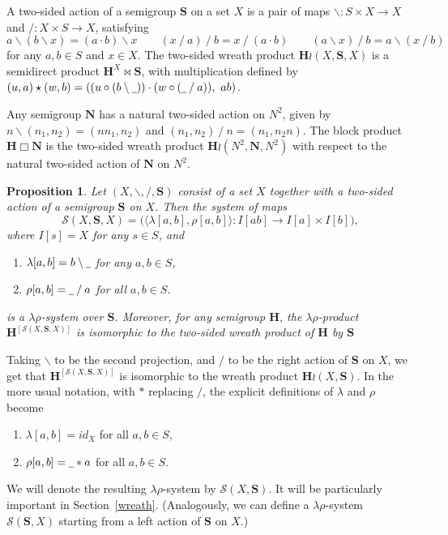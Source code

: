 \documentclass{amsart}
\newtheorem{proposition}{Proposition}
\def\ld{\mathbin{\backslash}}
\def\rd{\mathbin{/}}
\newcommand{\bl}{\underline{\hspace{1ex}}}
\begin{document}
A two-sided action of a 
semigroup $\mathbf{S}$ on a set $X$ is a pair of maps $\ld\colon S\times X\to X$ and
$\rd\colon X\times S\to X$, satisfying 
$$
a\ld (b\ld x) = (a\cdot b)\ld x\qquad (x\rd a)\rd b = x\rd (a\cdot b)\qquad
(a\ld x)\rd b=a\ld (x\rd b)
$$
for any $a,b\in S$  and $x\in X$. The two-sided wreath product
$\mathbf{H}\wr (X,\mathbf{S},X)$ is a semidirect product
$\mathbf{H}^X\bowtie \mathbf{S}$, with multiplication defined by
$(u, a)\star(w,b) = ((u\circ(b\ld\bl)) \cdot (w\circ(\bl\rd a)),\ ab)$.



Any semigroup $\mathbf{N}$ has a natural
two-sided action on $N^2$, given by $n\ld(n_1,n_2) = (nn_1, n_2)$ and
$(n_1,n_2)\rd n = (n_1,n_2n)$. The block product
$\mathbf{H}\mathbin{\Box}\mathbf{N}$ is the two-sided wreath product
$\mathbf{H}\wr (N^2,\mathbf{N},N^2)$ with
respect to the natural two-sided action of $\mathbf{N}$ on $N^2$.

\begin{proposition}\label{action-wreath-block}
Let $(X,\ld,\rd,\mathbf{S})$ consist of a set
$X$ together with a two-sided 
action of a semigroup $\mathbf{S}$ on $X$. Then the system of maps
$$
\mathcal{S}(X,\mathbf{S},X) =  \bigl(\langle \lambda[a,b],\rho[a,b]\rangle\colon
I[ab]\to I[a]\times I[b]\bigr),
$$
where $I[s]=X$ for any $s\in S$, and 
\begin{enumerate}
\item $\lambda[a,b] = b\ld\bl$\; for any $a,b\in S$,
\item $\rho[a,b] = \bl\rd a$\; for all $a,b\in S$. 
\end{enumerate}
is a $\lambda\rho$-system over $\mathbf{S}$. Moreover, for any semigroup
$\mathbf{H}$, the $\lambda\rho$-product
$\mathbf{H}^{[\mathcal{S}(X,\mathbf{S},X)]}$ is isomorphic 
to the two-sided wreath product of\/ $\mathbf{H}$ by
$\mathbf{S}$
\end{proposition}

Taking $\ld$ to be the second projection,
and $\rd$ to be the right action of $\mathbf{S}$ on $X$,
we get that $\mathbf{H}^{[\mathcal{S}(X,\mathbf{S},X)]}$ is
isomorphic to the wreath product $\mathbf{H}\wr (X,\mathbf{S})$.
In the more usual notation, with $\ast$ replacing $\rd$,
the explicit definitions of $\lambda$ and $\rho$ become   
\begin{enumerate}
\item $\lambda[a,b] = {id}_X$ for all $a,b\in S$,
\item $\rho[a,b] = \bl\ast a$ for all $a,b\in S$. 
\end{enumerate}
We will denote the
resulting $\lambda\rho$-system by $\mathcal{S}(X,\mathbf{S})$.
It will be particularly important in Section~\ref{wreath}.
(Analogously, we can define a $\lambda\rho$-system
$\mathcal{S}(\mathbf{S}, X)$ starting from a left action of $\mathbf{S}$ on $X$.) 
\end{document}
